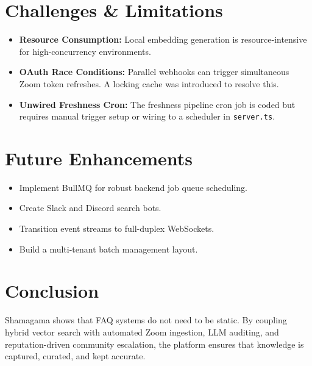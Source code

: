 \documentclass[11pt,a4paper]{article}
\begin{document}
\section{Challenges \& Limitations}
\begin{itemize}
    \item \textbf{Resource Consumption:} Local embedding generation is resource-intensive for high-concurrency environments.
    \item \textbf{OAuth Race Conditions:} Parallel webhooks can trigger simultaneous Zoom token refreshes. A locking cache was introduced to resolve this.
    \item \textbf{Unwired Freshness Cron:} The freshness pipeline cron job is coded but requires manual trigger setup or wiring to a scheduler in \texttt{server.ts}.
\end{itemize}

\section{Future Enhancements}
\begin{itemize}
    \item Implement BullMQ for robust backend job queue scheduling.
    \item Create Slack and Discord search bots.
    \item Transition event streams to full-duplex WebSockets.
    \item Build a multi-tenant batch management layout.
\end{itemize}

\section{Conclusion}
Shamagama shows that FAQ systems do not need to be static. By coupling hybrid vector search with automated Zoom ingestion, LLM auditing, and reputation-driven community escalation, the platform ensures that knowledge is captured, curated, and kept accurate.
\end{document}

